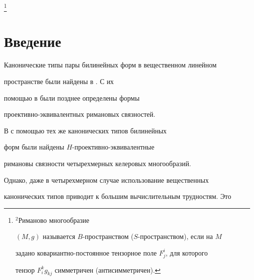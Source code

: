 \thanks{${}^2$Риманово многообразие


$(M,g)$ называется $B$-пространством ($S$-пространством), если на $M$


задано ковариантно-постоянное тензорное поле $F^i_j$, для которого


тензор $F^k_i g_{kj}$ симметричен (антисимметричен).}





\date{}







\pagestyle{plain} %













\maketitle


\label{begin}





\section*{Введение}





Канонические типы пары билинейных форм в вещественном линейном


пространстве были найдены в \cite{pet1}. С их


помощью в \cite{am1} были позднее определены формы


проективно-эквивалентных римановых связностей.





В \cite{amka1} с помощью тех же канонических типов билинейных


форм были найдены $H$-проективно-эквивалентные


римановы связности четырехмерных келеровых многообразий.


Однако, даже в четырехмерном случае использование вещественных


канонических типов приводит к большим вычислительным трудностям. Это



